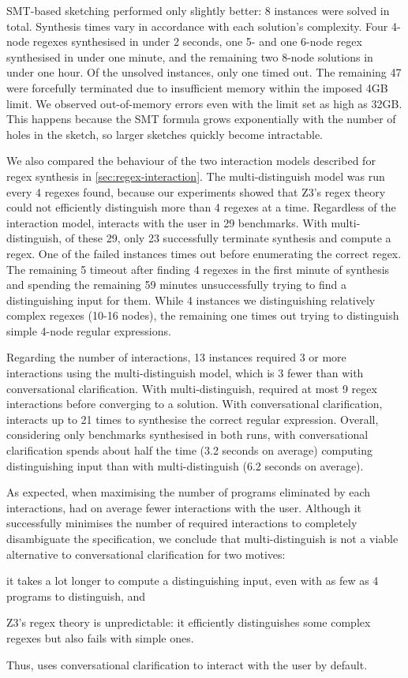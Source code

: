 \ac{SMT}-based sketching performed only slightly better: 8 instances were solved in total. Synthesis times vary in accordance with each solution's complexity. Four 4-node regexes synthesised in under 2 seconds, one 5- and one 6-node regex synthesised in under one minute, and the remaining two 8-node solutions in under one hour. Of the unsolved instances, only one timed out. The remaining 47 were forcefully terminated due to insufficient memory within the imposed 4GB limit. We observed out-of-memory errors even with the limit set as high as 32GB. This happens because the \ac{SMT} formula grows exponentially with the number of holes in the sketch, so larger sketches quickly become intractable.

We also compared the behaviour of the two interaction models described for regex synthesis in \autoref{sec:regex-interaction}.
The multi-distinguish model was run every 4 regexes found, because
our experiments showed that Z3's regex theory could not efficiently distinguish more than 4 regexes at a time.
%
Regardless of the interaction model, \Forest interacts with the user in 29 benchmarks. With multi-distinguish, of these 29, only 23 successfully terminate synthesis and compute a regex.
%
One of the failed instances times out before enumerating the correct regex. The remaining 5 timeout after finding 4 regexes in the first minute of synthesis and spending the remaining 59 minutes unsuccessfully trying to find a distinguishing input for them.
While 4 instances we distinguishing relatively complex regexes (10-16 nodes), the remaining one times out trying to distinguish simple 4-node regular expressions.

Regarding the number of interactions, 13 instances required 3 or more interactions using the multi-distinguish model, which is 3 fewer than with conversational clarification.
With multi-distinguish, \Forest required at most 9 regex interactions before converging to a solution. With conversational clarification, \Forest interacts up to 21 times to synthesise the correct regular expression.
Overall, considering only benchmarks synthesised in both runs, with conversational clarification \Forest spends about half the time (3.2 seconds on average) computing distinguishing input than with multi-distinguish (6.2 seconds on average).

As expected, when maximising the number of programs eliminated by each interactions, \Forest had on average fewer interactions with the user.
Although it successfully minimises the number of required interactions to completely disambiguate the specification, we conclude that multi-distinguish is not a viable alternative to conversational clarification for two motives:
\begin{enumerate*}[label=(\roman*)]
    \item it takes a lot longer to compute a distinguishing input, even with as few as 4 programs to distinguish, and
    \item Z3's regex theory is unpredictable: it efficiently distinguishes some complex regexes but also fails with simple ones.
\end{enumerate*}
Thus, \Forest uses conversational clarification to interact with the user by default.
